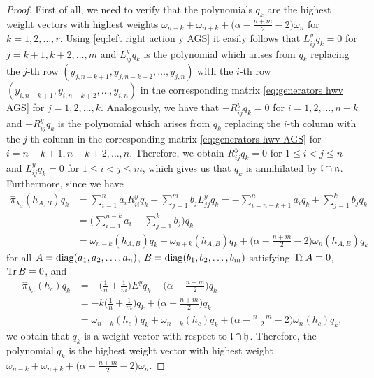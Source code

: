 \begin{proof}First of all, we need to verify that the polynomials $q_k$ are the highest weight vectors with highest weights $\omega_{n-k}+\omega_{n+k}+\big(\alpha - \frac{n + m}{2} -2\big)\omega_n$ for $k=1,2,\dots,r$. Using \eqref{eq:left right action y AGS} it easily follows that $L^y_{ij}q_k=0$ for $j=k+1,k+2,\dots,m$ and $L^y_{ij}q_k$ is the polynomial which arises from $q_k$ replacing the $j$-th row $(y_{j,n-k+1},y_{j,n-k+2},\dots,y_{j,n})$  with the $i$-th row $(y_{i,n-k+1},y_{i,n-k+2},\dots,y_{i,n})$ in the corresponding matrix \eqref{eq:generators hwv AGS} for $j=1,2,\dots,k$. Analogously, we have that $-R^y_{ij}q_k=0$ for $i=1,2,\dots,n-k$ and $-R^y_{ij}q_k$ is the polynomial which arises from $q_k$ replacing the $i$-th column  with the $j$-th column  in the corresponding matrix \eqref{eq:generators hwv AGS} for $i=n-k+1,n-k+2,\dots,n$. Therefore, we obtain $R^y_{ij}q_k=0$ for $1 \leq i < j \leq n$ and $L^y_{ij}q_k=0$ for $1 \leq i < j \leq m$, which gives us that $q_k$ is annihilated by $\mathfrak{l} \cap \mathfrak{n}$. Furthermore, since we have
\begin{align*}
  \hat{\pi}_{\lambda_\alpha}\!(h_{A,B})q_k &= \sum_{i=1}^n a_i R^y_{ii}q_k + \sum_{j=1}^m b_j L^y_{jj}q_k = -\sum_{i=n-k+1}^n a_i q_k + \sum_{j=1}^k b_j q_k \\
  &= \bigg(\sum_{i=1}^{n-k} a_i + \sum_{j=1}^k b_j \bigg)q_k \\
  &= \omega_{n-k}(h_{A,B})q_k + \omega_{n+k}(h_{A,B})q_k+ \bigg(\alpha-\frac{n+m}{2}-2\bigg)\omega_n(h_{A,B})q_k
\end{align*}
for all $A=\mathop {\rm diag} \nolimits(a_1,a_2,\dots,a_n)$, $B=\mathop {\rm diag} \nolimits(b_1,b_2,\dots,b_m)$ satisfying $\operatorname{\mathrm{Tr}} A=0$, $\operatorname{\mathrm{Tr}} B=0$, and
\begin{align*}
  \hat{\pi}_{\lambda_\alpha}\!(h_c)q_k&= -\bigg(\frac{1}{n} + \frac{1}{m}\bigg)E^yq_k + \bigg(\alpha -\frac{n+m}{2}\bigg)q_k \\
  &= -k\bigg(\frac{1}{n} + \frac{1}{m}\bigg)q_k+ \bigg(\alpha -\frac{n+m}{2}\bigg)q_k \\
  &= \omega_{n-k}(h_c)q_k + \omega_{n+k}(h_c)q_k+\bigg(\alpha-\frac{n+m}{2}-2\bigg)\omega_n(h_c)q_k,
\end{align*}
we obtain that $q_k$ is a weight vector with respect to $\mathfrak{l} \cap \mathfrak{h}$. Therefore, the polynomial $q_k$ is the highest weight vector with highest weight $\omega_{n-k}+ \omega_{n+k} + \big(\alpha-\frac{n+m}{2}-2\big)\omega_n$.


\end{proof}
